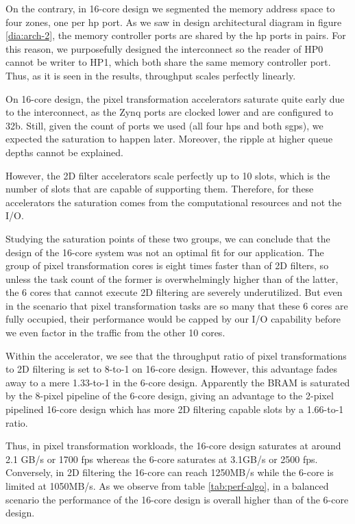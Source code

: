 On the contrary, in 16-core design we segmented the memory address space to four zones, one per \gls{hp} port.
As we saw in design architectural diagram in figure \ref{dia:arch-2}, the memory controller ports are shared 
by the \gls{hp} ports in pairs. 
For this reason, we purposefully designed the interconnect so the reader of HP0 cannot be writer to HP1,
which both share the same memory controller port.
Thus, as it is seen in the results, throughput scales perfectly linearly.

On 16-core design, the pixel transformation accelerators saturate quite early due to the interconnect,
as the Zynq ports are clocked lower and are configured to 32b. 
Still, given the count of ports we used (all four \glspl{hp} and both \glspl{sgp}), we expected the saturation to happen later.
Moreover, the ripple at higher queue depths cannot be explained.

However, the 2D filter accelerators scale perfectly up to 10 slots, which is the number of slots that are capable of supporting them.
Therefore, for these accelerators the saturation comes from the computational resources and not the I/O.

Studying the saturation points of these two groups, we can conclude that the design of the 16-core system was not
an optimal fit for our application. The group of pixel transformation cores is eight times faster than of 2D filters,
so unless the task count of the former is overwhelmingly higher than of the latter, the 6 cores that cannot execute 2D filtering
are severely underutilized. But even in the scenario that pixel transformation tasks are so many that these 6 cores
are fully occupied, their performance would be capped by our I/O capability before we even factor in the traffic from the other 10 cores.

Within the accelerator, we see that the throughput ratio of pixel transformations to 2D filtering is set to 8-to-1 on 16-core design.
However, this advantage fades away to a mere 1.33-to-1 in the 6-core design. Apparently the BRAM is saturated by the
8-pixel pipeline of the 6-core design, giving an advantage to the 2-pixel pipelined 16-core design which has more 2D filtering
capable slots by a 1.66-to-1 ratio.

Thus, in pixel transformation workloads, the 16-core design saturates at around 2.1 GB/s or 1700 fps whereas the 6-core
saturates at 3.1GB/s or 2500 fps. Conversely, in 2D filtering the 16-core can reach 1250MB/s while the 6-core is limited at 1050MB/s.
As we observe from table \ref{tab:perf-algo}, in a balanced scenario the performance of the 16-core design is overall higher than of the 6-core design.


